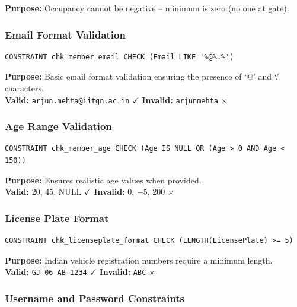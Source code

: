 \documentclass[a4paper, 12pt]{article}
\begin{document}
\textbf{Purpose:} Occupancy cannot be negative -- minimum is zero (no one at gate).

\subsubsection{Email Format Validation}

\begin{lstlisting}[style=sqlstyle, caption={Email Format CHECK}, label={lst:chk-email}]
CONSTRAINT chk_member_email CHECK (Email LIKE '%@%.%')
\end{lstlisting}

\textbf{Purpose:} Basic email format validation ensuring the presence of `@' and `.' characters.\\
\textbf{Valid:} \texttt{arjun.mehta@iitgn.ac.in} $\checkmark$ \quad \textbf{Invalid:} \texttt{arjunmehta} $\times$

\subsubsection{Age Range Validation}

\begin{lstlisting}[style=sqlstyle, caption={Age Range CHECK}, label={lst:chk-age}]
CONSTRAINT chk_member_age CHECK (Age IS NULL OR (Age > 0 AND Age < 150))
\end{lstlisting}

\textbf{Purpose:} Ensures realistic age values when provided.\\
\textbf{Valid:} 20, 45, NULL $\checkmark$ \quad \textbf{Invalid:} 0, $-5$, 200 $\times$

\subsubsection{License Plate Format}

\begin{lstlisting}[style=sqlstyle, caption={License Plate Length CHECK}, label={lst:chk-plate}]
CONSTRAINT chk_licenseplate_format CHECK (LENGTH(LicensePlate) >= 5)
\end{lstlisting}

\textbf{Purpose:} Indian vehicle registration numbers require a minimum length.\\
\textbf{Valid:} \texttt{GJ-06-AB-1234} $\checkmark$ \quad \textbf{Invalid:} \texttt{ABC} $\times$

\subsubsection{Username and Password Constraints}
\end{document}
